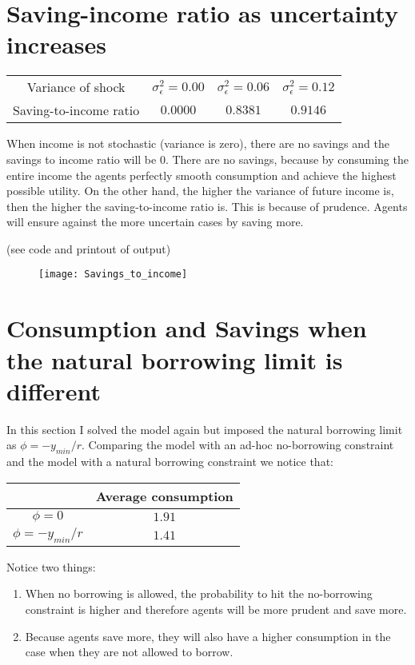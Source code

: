 \documentclass[letter,11pt]{article}
\begin{document}
 


\section{Saving-income ratio as uncertainty increases}
\hfill

\begin{tabular}{ c  | c | c | c   } \hline
Variance of shock  & $\sigma_{\epsilon}^2=0.00$  & $\sigma_{\epsilon}^2 = 0.06$ & $\sigma_{\epsilon}^2 = 0.12$  \\  
Saving-to-income ratio & $0.0000$ &   $0.8381$ &  $0.9146$ \\ \hline
\end{tabular}

When income is not stochastic (variance is zero), there are no savings and the savings to income ratio will be 0. There are no savings, because by consuming the entire income the agents perfectly smooth consumption and achieve the highest possible utility. On the other hand, the higher the variance of future income is, then the higher the saving-to-income ratio is. This is because of prudence. Agents will ensure against the more uncertain cases by saving more.

(see code and printout of output)

\begin{figure}[h!]
  \centering
        \texttt{[image: Savings\_to\_income]}
  \end{figure}



\clearpage
\section{Consumption and Savings when the natural borrowing limit is different}
\hfill

In this section I  solved the model again but imposed the natural borrowing limit as  
$\phi = -y_{min}/r$. Comparing the model with an ad-hoc no-borrowing constraint and the model with a natural borrowing constraint we notice that:

\begin{tabular}{ c| c  }
& Average consumption \\ \hline
$\phi = 0$ & $1.91$ \\ 
$\phi = -y_{min}/r$ & $1.41$ \\  \hline
\end{tabular}

Notice two things:
\begin{enumerate}[noitemsep]
\item When no borrowing is allowed, the probability to hit the no-borrowing constraint is higher and therefore agents will be more prudent and save more. 
\item Because agents save more, they will also have a higher consumption in the case when they are not allowed to borrow. 
\end{enumerate}
\end{document}

